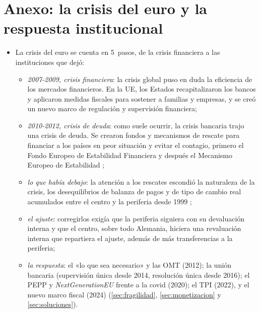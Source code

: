 \documentclass[11pt]{article}
\begin{document}
\section{Anexo: la crisis del euro y la respuesta institucional}\label{anexo:crisis-euro}

\begin{itemize}
\item La crisis del euro se cuenta en 5~pasos, de la crisis financiera a las instituciones que dejó:
  \begin{itemize}
  \item \emph{2007-2009, crisis financiera}: la crisis global puso en duda la eficiencia de los mercados financieros. En la UE, los Estados recapitalizaron los bancos y aplicaron medidas fiscales para sostener a familias y empresas, y se creó un nuevo marco de regulación y supervisión financiera;
  \item \emph{2010-2012, crisis de deuda}: como suele ocurrir, la crisis bancaria trajo una crisis de deuda. Se crearon fondos y mecanismos de rescate para financiar a los países en peor situación y evitar el contagio, primero el Fondo Europeo de Estabilidad Financiera y después el Mecanismo Europeo de Estabilidad\nocite{SanchisiMarco2014Economics} ;
  \item \emph{lo que había debajo}: la atención a los rescates escondió la naturaleza de la crisis, los desequilibrios de balanza de pagos y de tipo de cambio real acumulados entre el centro y la periferia desde 1999\nocite{SanchisiMarco2014Economics} ;
  \item \emph{el ajuste}: corregirlos exigía que la periferia siguiera con su devaluación interna y que el centro, sobre todo Alemania, hiciera una revaluación interna que repartiera el ajuste, además de más transferencias a la periferia\nocite{SanchisiMarco2014Economics};
  \item \emph{la respuesta}: el «lo que sea necesario» y las OMT (2012); la unión bancaria (supervisión única desde 2014, resolución única desde 2016); el PEPP y \emph{NextGenerationEU} frente a la covid (2020); el TPI (2022), y el nuevo marco fiscal (2024)\nocite{BCE2012OMT,RegUE2013MUS,RegUE2014MUR,BCE2026PEPP,CE2026NGEU,BCE2022TPI,UE2024Reglamento1263} (\ref{sec:fragilidad}, \ref{sec:monetizacion} y \ref{sec:soluciones}).
  \end{itemize}
\end{itemize}
\end{document}
